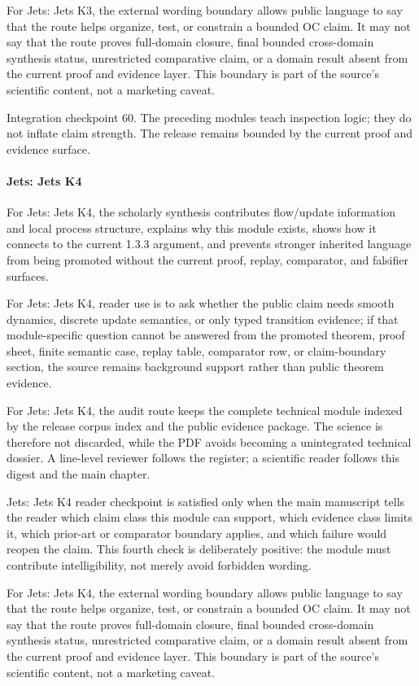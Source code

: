 For Jets: Jets K3, the external wording boundary allows public language to say that the route helps organize, test, or constrain a bounded OC claim. It may not say that the route proves full-domain closure, final bounded cross-domain synthesis status, unrestricted comparative claim, or a domain result absent from the current proof and evidence layer. This boundary is part of the source's scientific content, not a marketing caveat.


Integration checkpoint 60. The preceding modules teach inspection logic; they do not inflate claim strength. The release remains bounded by the current proof and evidence surface.


\paragraph{Jets: Jets K4}

For Jets: Jets K4, the scholarly synthesis contributes flow/update information and local process structure, explains why this module exists, shows how it connects to the current 1.3.3 argument, and prevents stronger inherited language from being promoted without the current proof, replay, comparator, and falsifier surfaces.


For Jets: Jets K4, reader use is to ask whether the public claim needs smooth dynamics, discrete update semantics, or only typed transition evidence; if that module-specific question cannot be answered from the promoted theorem, proof sheet, finite semantic case, replay table, comparator row, or claim-boundary section, the source remains background support rather than public theorem evidence.


For Jets: Jets K4, the audit route keeps the complete technical module indexed by the release corpus index and the public evidence package. The science is therefore not discarded, while the PDF avoids becoming a unintegrated technical dossier. A line-level reviewer follows the register; a scientific reader follows this digest and the main chapter.


Jets: Jets K4 reader checkpoint is satisfied only when the main manuscript tells the reader which claim class this module can support, which evidence class limits it, which prior-art or comparator boundary applies, and which failure would reopen the claim. This fourth check is deliberately positive: the module must contribute intelligibility, not merely avoid forbidden wording.


For Jets: Jets K4, the external wording boundary allows public language to say that the route helps organize, test, or constrain a bounded OC claim. It may not say that the route proves full-domain closure, final bounded cross-domain synthesis status, unrestricted comparative claim, or a domain result absent from the current proof and evidence layer. This boundary is part of the source's scientific content, not a marketing caveat.


